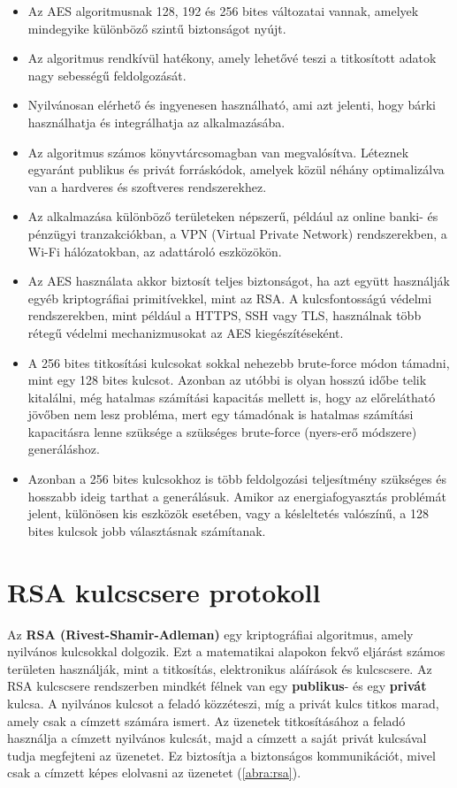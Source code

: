 \begin{itemize}
	\item Az AES algoritmusnak 128, 192 és 256 bites változatai vannak, amelyek mindegyike különböző szintű biztonságot nyújt.
	\item Az algoritmus rendkívül hatékony, amely lehetővé teszi a titkosított adatok nagy sebességű feldolgozását.
	\item Nyilvánosan elérhető és ingyenesen használható, ami azt jelenti, hogy bárki használhatja és integrálhatja az alkalmazásába.
	\item Az algoritmus számos könyvtárcsomagban van megvalósítva. Léteznek egyaránt publikus és privát forráskódok, amelyek közül néhány optimalizálva van a hardveres és szoftveres rendszerekhez.
	\item Az alkalmazása különböző területeken népszerű, például az online banki- és pénzügyi tranzakciókban, a VPN (Virtual Private Network) rendszerekben, a Wi-Fi hálózatokban, az adattároló eszközökön.
	\item Az AES használata akkor biztosít teljes biztonságot, ha azt együtt használják egyéb kriptográfiai primitívekkel, mint az RSA. A kulcsfontosságú védelmi rendszerekben, mint például a HTTPS, SSH vagy TLS, használnak több rétegű védelmi mechanizmusokat az AES kiegészítéseként.
	\item A 256 bites titkosítási kulcsokat sokkal nehezebb brute-force módon támadni, mint egy 128 bites kulcsot. Azonban az utóbbi is olyan hosszú időbe telik kitalálni, még hatalmas számítási kapacitás mellett is, hogy az előrelátható jövőben nem lesz probléma, mert egy támadónak is hatalmas számítási kapacitásra lenne szüksége a szükséges brute-force (nyers-erő módszere) generáláshoz.
	\item Azonban a 256 bites kulcsokhoz is több feldolgozási teljesítmény szükséges és hosszabb ideig tarthat a generálásuk. Amikor az energiafogyasztás problémát jelent, különösen kis eszközök esetében, vagy a késleltetés valószínű, a 128 bites kulcsok jobb választásnak számítanak.
\end{itemize}

\section {RSA kulcscsere protokoll}

Az \textbf{RSA (Rivest-Shamir-Adleman)} egy kriptográfiai algoritmus, amely nyilvános kulcsokkal dolgozik. Ezt a matematikai alapokon fekvő eljárást számos területen használják, mint a titkosítás, elektronikus aláírások és kulcscsere. Az RSA kulcscsere rendszerben mindkét félnek van egy \textbf{publikus}- és egy \textbf{privát} kulcsa. A nyilvános kulcsot a feladó közzéteszi, míg a privát kulcs titkos marad, amely csak a címzett számára ismert. Az üzenetek titkosításához a feladó használja a címzett nyilvános kulcsát, majd a címzett a saját privát kulcsával tudja megfejteni az üzenetet. Ez biztosítja a biztonságos kommunikációt, mivel csak a címzett képes elolvasni az üzenetet (\ref{abra:rsa}).

